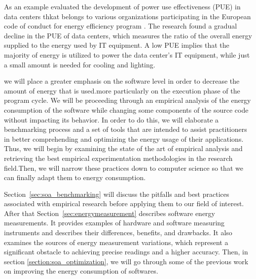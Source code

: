 
As an example \citeauthor{avgerinou2017trends} evaluated the development of power use effectiveness (PUE) in data centers thkat belongs to various organizations participating in the European code of conduct for energy efficiency program \cite{avgerinou2017trends}.
The research found a gradual decline in the PUE of data centers, which measures the ratio of the overall energy supplied to the energy used by IT equipment.
A low PUE implies that the majority of energy is utilized to power the data center's IT equipment, while just a small amount is needed for cooling and lighting.

we will place a greater emphasis on the software level in order to decrease the amount of energy that is used.more particularly on the execution phase of the program cycle.
We will be proceeding through an empirical analysis of the energy consumption of the software while changing some components of the source code without impacting its behavior.
In order to do this, we will elaborate a benchmarking process and a set of tools that are intended to assist practitioners in better comprehending and optimizing the energy usage of their applications.
Thus, we will begin by examining the state of the art of empirical analysis and retrieving the best empirical experimentation methodologies in the research field.Then, we will narrow these practices down to computer science so that we can finally adapt them to energy consumption.

Section~\ref{sec:soa_benchmarking} will discuss the pitfalls and best practices associated with empirical research before applying them to our field of interest.
After that Section~\ref{sec:energymeasurement} describes software energy measurements.
It provides examples of hardware and software measuring instruments and describes their differences, benefits, and drawbacks. It also examines the sources of energy measurement variations, which represent a significant obstacle to achieving precise readings and a higher accuracy.
Then, in section \ref{section:soa_optimization}, we will go through some of the previous work on improving the energy consumption of softwares.

